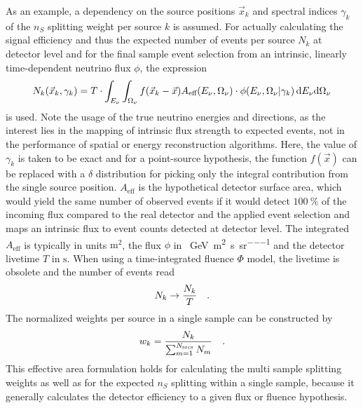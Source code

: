 As an example, a dependency on the source positions $\vec{x}_k$ and spectral indices $\gamma_k$ of the $n_S$ splitting weight per source $k$ is assumed.
For actually calculating the signal efficiency and thus the expected number of events per source $N_k$ at detector level and for the final sample event selection from an intrinsic, linearly time-dependent neutrino flux $\phi$, the expression
\begin{equation}
  N_k(\vec{x}_k, \gamma_k)
  = T \cdot \int_{E_\nu} \int_{\Omega_\nu} f(\vec{x}_k - \vec{x})
      A_\text{eff}(E_\nu,\Omega_\nu) \cdot
      \phi(E_\nu,\Omega_\nu | \gamma_k) \,\mathrm{d}E_\nu\mathrm{d}\Omega_\nu
\end{equation}
is used.
Note the usage of the true neutrino energies and directions, as the interest lies in the mapping of intrinsic flux strength to expected events, not in the performance of spatial or energy reconstruction algorithms.
Here, the value of $\gamma_k$ is taken to be exact and for a point-source hypothesis, the function $f(\vec{x})$ can be replaced with a $\delta$ distribution for picking only the integral contribution from the single source position.
$A_\text{eff}$ is the hypothetical detector surface area, which would yield the same number of observed events if it would detect $\SI{100}{\percent}$ of the incoming flux compared to the real detector and the applied event selection and maps an intrinsic flux to event counts detected at detector level.
The integrated $A_\text{eff}$ is typically in units $\si{\m\squared}$, the flux $\phi$ in \si{\per\GeV\per\m\squared\per\second\per\steradian} and the detector livetime $T$ in $\si{\second}$.
When using a time-integrated fluence $\Phi$ model, the livetime is obsolete and the number of events read
\begin{equation}
  N_k \rightarrow \frac{N_k}{T}
  \quad\text{.}
\end{equation}
The normalized weights per source in a single sample can be constructed by
\begin{equation}
  w_k = \frac{N_k}{\sum_{m=1}^{N_\text{srcs}} N_m}
  \quad\text{.}
\end{equation}
This effective area formulation holds for calculating the multi sample splitting weights as well as for the expected $n_S$ splitting within a single sample, because it generally calculates the detector efficiency to a given flux or fluence hypothesis.

